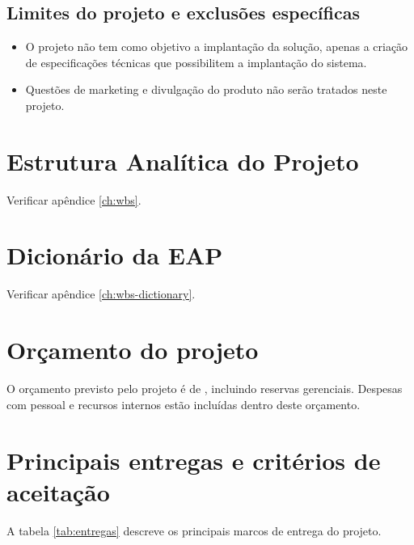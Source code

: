 \subsection{Limites do projeto e exclusões específicas}

\begin{itemize}
\item O projeto não tem como objetivo a implantação da solução, apenas a criação de especificações técnicas que possibilitem a implantação do sistema.
\item Questões de marketing e divulgação do produto não serão tratados neste projeto.
\end{itemize}

\section{Estrutura Analítica do Projeto}

Verificar apêndice \ref{ch:wbs}.

\section{Dicionário da EAP}

Verificar apêndice \ref{ch:wbs-dictionary}.

\section{Orçamento do projeto}

O orçamento previsto pelo projeto é de \maximumBudget{}, incluindo reservas gerenciais. Despesas com pessoal e recursos internos estão incluídas dentro deste orçamento.

\section{Principais entregas e critérios de aceitação}

A tabela \ref{tab:entregas} descreve os principais marcos de entrega do projeto.

